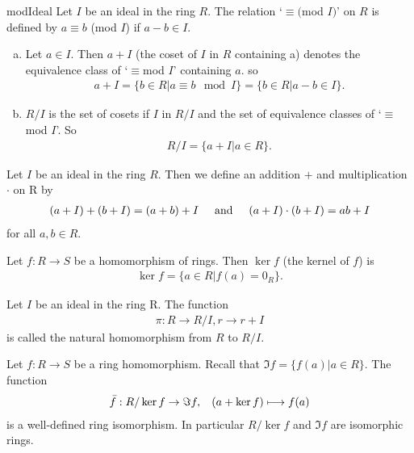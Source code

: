 \begin{defn}{modIdeal}
	Let $I$ be an ideal in the ring $R$. The relation `$\equiv ($mod $I)$' on $R$ is defined by $a \equiv b$ (mod $I$) if $a-b \in I$.
\end{defn}
\begin{defn}[Cosets]{1}
	\begin{enumerate}[(a)]
		\item Let $a \in I$. Then $a+I$ (the coset of $I$ in $R$ containing a) denotes the equivalence class of `$\equiv $mod $I$' containing $a$. so
		\begin{align}
		a+I = \{b \in R| a \equiv b \mod I\} = \{b \in R| a-b \in I\}.
		\end{align}
		\item $R/I$ is the set of cosets if $I$ in $R/I$ and the set of equivalence classes of `$\equiv$ mod $I$'. So
		\begin{align}
		R/I=\{a+I|a \in R\}.
		\end{align} 
	\end{enumerate}
\end{defn}
\begin{defn}{}
	Let $I$ be an ideal in the ring $R$. Then we define an addition $+$ and multiplication $\cdot$ on R by
	\begin{align*}
	(a+I)+(b+I)=(a+b)+I \hspace{.5cm} \textrm{and}\hspace{0.5cm} (a+I)\cdot(b+I)=ab+I
	\end{align*}
	for all $a,b \in R$.
\end{defn}
\begin{defn}[Kernal]{1}
	Let $f: R\rightarrow S$ be a homomorphism of rings. Then $\ker f$ (the kernel of $f$) is
	\begin{align*}
	\ker f = \{a \in R | f(a)=0_R \}.
	\end{align*}
\end{defn}
\begin{defn}{1}
	Let $I$ be an ideal in the ring R. The function 
	\begin{align*}
	\pi: R \rightarrow R/I, r\rightarrow r+I
	\end{align*} 
	is called the natural homomorphism from $R$ to $R/I$.
\end{defn}
\begin{theo}{1}
	Let $f: R \rightarrow S$ be a ring homomorphism. Recall that $\Im f=\{f(a) |a \in R \}$. The function
	\begin{align}
	\bar{f}: R/\ker f \rightarrow \Im f, \hspace{.3 cm} (a+\ker f)\longmapsto f(a)
	\end{align}
	is a well-defined ring isomorphism. In particular $R/\ker f$ and $\Im f$ are isomorphic rings.
\end{theo}
